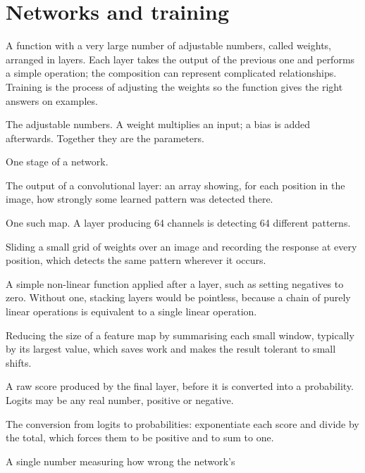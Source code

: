 \section{Networks and training}
\begin{description}[style=nextline,leftmargin=1.4em]
  \item[Neural network] A function with a very large number of adjustable
        numbers, called weights, arranged in layers. Each layer takes the
        output of the previous one and performs a simple operation; the
        composition can represent complicated relationships. Training is the
        process of adjusting the weights so the function gives the right
        answers on examples.
  \item[Weight and bias] The adjustable numbers. A weight multiplies an
        input; a bias is added afterwards. Together they are the parameters.
  \item[Layer] One stage of a network.
  \item[Feature map] The output of a convolutional layer: an array showing,
        for each position in the image, how strongly some learned pattern was
        detected there.
  \item[Channel] One such map. A layer producing 64 channels is detecting 64
        different patterns.
  \item[Convolution] Sliding a small grid of weights over an image and
        recording the response at every position, which detects the same
        pattern wherever it occurs.
  \item[Activation function] A simple non-linear function applied after a
        layer, such as setting negatives to zero. Without one, stacking
        layers would be pointless, because a chain of purely linear
        operations is equivalent to a single linear operation.
  \item[Pooling] Reducing the size of a feature map by summarising each small
        window, typically by its largest value, which saves work and makes
        the result tolerant to small shifts.
  \item[Logit] A raw score produced by the final layer, before it is
        converted into a probability. Logits may be any real number, positive
        or negative.
  \item[Softmax] The conversion from logits to probabilities: exponentiate
        each score and divide by the total, which forces them to be positive
        and to sum to one.
  \item[Loss function] A single number measuring how wrong the network's

\end{description}
